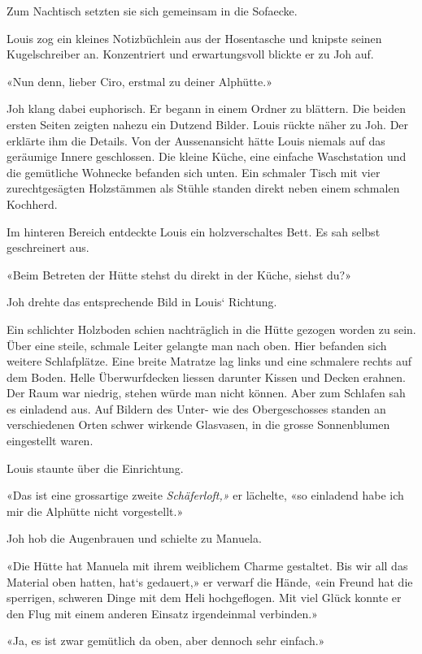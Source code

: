 Zum Nachtisch setzten sie sich gemeinsam in die Sofaecke.

Louis zog ein kleines Notizbüchlein aus der Hosentasche und knipste
seinen Kugelschreiber an. Konzentriert und erwartungsvoll blickte er zu
Joh auf.

«Nun denn, lieber Ciro, erstmal zu deiner Alphütte.»

Joh klang dabei euphorisch. Er begann in einem Ordner zu blättern. Die
beiden ersten Seiten zeigten nahezu ein Dutzend Bilder. Louis rückte
näher zu Joh. Der erklärte ihm die Details. Von der Aussenansicht hätte
Louis niemals auf das geräumige Innere geschlossen. Die kleine Küche,
eine einfache Waschstation und die gemütliche Wohnecke befanden sich
unten. Ein schmaler Tisch mit vier zurechtgesägten Holzstämmen als
Stühle standen direkt neben einem schmalen Kochherd.

Im hinteren Bereich entdeckte Louis ein holzverschaltes Bett. Es sah
selbst geschreinert aus.

«Beim Betreten der Hütte stehst du direkt in der Küche, siehst du?»

Joh drehte das entsprechende Bild in Louis` Richtung.

Ein schlichter Holzboden schien nachträglich in die Hütte gezogen worden
zu sein. Über eine steile, schmale Leiter gelangte man nach oben. Hier
befanden sich weitere Schlafplätze. Eine breite Matratze lag links und
eine schmalere rechts auf dem Boden. Helle Überwurfdecken liessen
darunter Kissen und Decken erahnen. Der Raum war niedrig, stehen würde
man nicht können. Aber zum Schlafen sah es einladend aus. Auf Bildern
des Unter- wie des Obergeschosses standen an verschiedenen Orten schwer
wirkende Glasvasen, in die grosse Sonnenblumen eingestellt waren.

Louis staunte über die Einrichtung.

«Das ist eine grossartige zweite \emph{Schäferloft,»} er lächelte, «so
einladend habe ich mir die Alphütte nicht vorgestellt.»

Joh hob die Augenbrauen und schielte zu Manuela.

«Die Hütte hat Manuela mit ihrem weiblichem Charme gestaltet. Bis wir
all das Material oben hatten, hat`s gedauert,» er verwarf die Hände,
«ein Freund hat die sperrigen, schweren Dinge mit dem Heli hochgeflogen.
Mit viel Glück konnte er den Flug mit einem anderen Einsatz irgendeinmal
verbinden.»

«Ja, es ist zwar gemütlich da oben, aber dennoch sehr einfach.»

